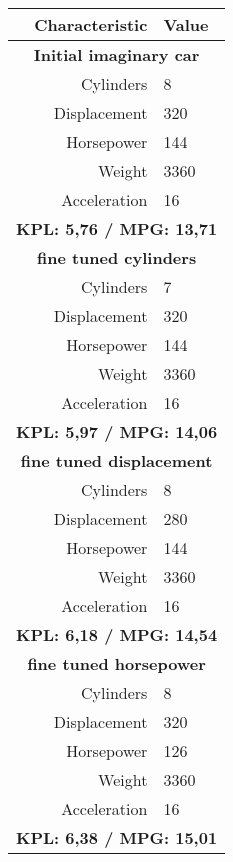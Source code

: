 \documentclass[a4paper, twocolumn]{article}
\begin{document}
\begin{table}[!ht]
    \centering
    \footnotesize
    \begin{tabular}{r | l}
        \hline\hline
        Characteristic & Value \\ [0.5ex] %
        \hline
        \multicolumn{2}{c}{\textbf{Initial imaginary car}} \\
        \hline
        Cylinders & 8 \\
        Displacement & 320 \\
        Horsepower & 144 \\
        Weight & 3360 \\
        Acceleration & 16 \\ [1ex]
        \hline
        \multicolumn{2}{c}{\textbf{KPL: 5,76 / MPG: 13,71 }} \\
        \hline\hline
        \multicolumn{2}{c}{\textbf{fine tuned cylinders}} \\
        \hline
        Cylinders & 7\\
        Displacement & 320 \\
        Horsepower & 144 \\
        Weight & 3360 \\
        Acceleration & 16 \\ [1ex]
        \hline
        \multicolumn{2}{c}{\textbf{KPL: 5,97 / MPG: 14,06 }} \\
        \hline\hline
        \multicolumn{2}{c}{\textbf{fine tuned displacement}} \\
        \hline
        Cylinders & 8\\
        Displacement & 280 \\
        Horsepower & 144 \\
        Weight & 3360 \\
        Acceleration & 16 \\ [1ex]
        \hline
        \multicolumn{2}{c}{\textbf{KPL: 6,18 / MPG: 14,54 }} \\
        \hline\hline
        \multicolumn{2}{c}{\textbf{fine tuned horsepower}} \\
        \hline
        Cylinders & 8\\
        Displacement & 320 \\
        Horsepower & 126 \\
        Weight & 3360 \\
        Acceleration & 16 \\ [1ex]
        \hline
        \multicolumn{2}{c}{\textbf{KPL: 6,38 / MPG: 15,01 }} \\

\end{tabular}
\end{table}
\end{document}
